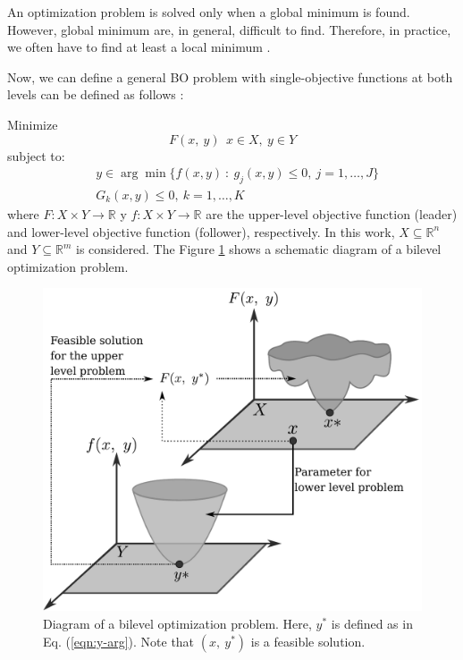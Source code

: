 \documentclass[conference]{IEEEtran}
\begin{document}
An optimization problem is solved only when a global minimum
is found. However, global minimum are, in general, difficult to find. Therefore,
in practice, we often have to find at least a local minimum \cite{rao2009engineering,back}.


Now, we can define a general BO problem with single-objective functions at both
levels can be defined as follows \cite{bard2013practical,dempe2002foundations}:

\noindent
Minimize
\begin{equation}
    F(x,\ y) \ \ x \in X , \ y \in Y 
    \label{eqn:minF1}
\end{equation}
% 
subject to:
% 
\begin{align}
    \label{eqn:y-arg}
    &y \in \arg \min \{ f(x, y) \ : \ g_j(x, y) \leq 0, \ j = 1,\ldots, J \}\\
    &G_k(x, y)  \leq 0, \ k = 1,\ldots,K
    \label{eqn:G}
\end{align}
where $F: X \times Y \to \mathbb{R}$ y $f: X \times Y \to \mathbb{R}$
are the upper-level objective function (leader) and lower-level objective function
(follower), respectively. In this work, $X \subseteq \mathbb{R}^n$ and
$Y \subseteq \mathbb{R}^m$ is considered. The Figure \ref{fig:bilevel} shows a
schematic diagram of a bilevel optimization problem.
% 
\begin{figure}[!ht]
    \centering
    \includegraphics[width=0.8\linewidth]{img/bilevel.pdf}
    \caption{Diagram of a bilevel optimization problem. Here, $y^*$ 
            is defined as in Eq. (\ref{eqn:y-arg}). Note that $(x,\ y^*)$
            is a feasible solution.}
    \label{fig:bilevel}
\end{figure}
\end{document}
